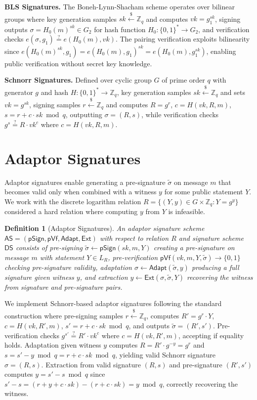 \documentclass[11pt,a4paper]{article}
\newtheorem{definition}[theorem]{Definition}
\newcommand{\ZZ}{\mathbb{Z}}
\begin{document}
{\textbf{BLS Signatures.} The Boneh-Lynn-Shacham scheme operates over bilinear groups where key generation samples $sk \xleftarrow{\$} \ZZ_q$ and computes $vk = g_1^{sk}$, signing outputs $\sigma = H_0(m)^{sk} \in G_2$ for hash function $H_0: \{0,1\}^* \to G_2$, and verification checks $e(\sigma, g_1) \stackrel{?}{=} e(H_0(m), vk)$. The pairing verification exploits bilinearity since $e(H_0(m)^{sk}, g_1) = e(H_0(m), g_1)^{sk} = e(H_0(m), g_1^{sk})$, enabling public verification without secret key knowledge.

\textbf{Schnorr Signatures.} Defined over cyclic group $G$ of prime order $q$ with generator $g$ and hash $H: \{0,1\}^* \to \ZZ_q$, key generation samples $sk \xleftarrow{\$} \ZZ_q$ and sets $vk = g^{sk}$, signing samples $r \xleftarrow{\$} \ZZ_q$ and computes $R = g^r$, $c = H(vk, R, m)$, $s = r + c \cdot sk \bmod q$, outputting $\sigma = (R, s)$, while verification checks $g^s \stackrel{?}{=} R \cdot vk^c$ where $c = H(vk, R, m)$.

\section{Adaptor Signatures}

Adaptor signatures enable generating a pre-signature $\tilde{\sigma}$ on message $m$ that becomes valid only when combined with a witness $y$ for some public statement $Y$. We work with the discrete logarithm relation $R = \{(Y, y) \in G \times \ZZ_q : Y = g^y\}$ considered a hard relation where computing $y$ from $Y$ is infeasible.

\begin{definition}[Adaptor Signatures]
An adaptor signature scheme $\textsf{AS} = (\textsf{pSign}, \textsf{pVf}, \textsf{Adapt}, \textsf{Ext})$ with respect to relation $R$ and signature scheme $\textsf{DS}$ consists of pre-signing $\tilde{\sigma} \leftarrow \textsf{pSign}(sk, m, Y)$ creating a pre-signature on message $m$ with statement $Y \in L_R$, pre-verification $\textsf{pVf}(vk, m, Y, \tilde{\sigma}) \to \{0,1\}$ checking pre-signature validity, adaptation $\sigma \leftarrow \textsf{Adapt}(\tilde{\sigma}, y)$ producing a full signature given witness $y$, and extraction $y \leftarrow \textsf{Ext}(\sigma, \tilde{\sigma}, Y)$ recovering the witness from signature and pre-signature pairs.
\end{definition}

We implement Schnorr-based adaptor signatures following the standard construction where pre-signing samples $r \xleftarrow{\$} \ZZ_q$, computes $R' = g^r \cdot Y$, $c = H(vk, R', m)$, $s' = r + c \cdot sk \bmod q$, and outputs $\tilde{\sigma} = (R', s')$. Pre-verification checks $g^{s'} \stackrel{?}{=} R' \cdot vk^c$ where $c = H(vk, R', m)$, accepting if equality holds. Adaptation given witness $y$ computes $R = R' \cdot g^{-y} = g^r$ and $s = s' - y \bmod q = r + c \cdot sk \bmod q$, yielding valid Schnorr signature $\sigma = (R, s)$. Extraction from valid signature $(R, s)$ and pre-signature $(R', s')$ computes $y = s' - s \bmod q$ since $s' - s = (r + y + c \cdot sk) - (r + c \cdot sk) = y \bmod q$, correctly recovering the witness.

}
\end{document}
